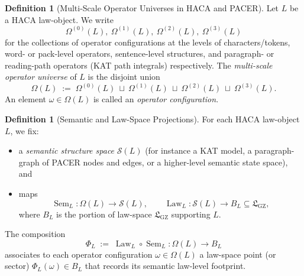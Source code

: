 \documentclass[11pt]{book}
\theoremstyle{plain}
\theoremstyle{definition}
\newtheorem{definition}[theorem]{Definition}
\theoremstyle{remark}
\newcommand{\GZLS}{\ensuremath{\mathfrak{L}_{\mathrm{GZ}}}}       \newcommand{\GZLT}{\ensuremath{M_{!w}}}                           \newcommand{\GZLOC}{\ensuremath{A_M}}                             \newcommand{\GZLC}{\ensuremath{\omega_{\mathrm{law}}}}            \newcommand{\GZLCurv}{\ensuremath{\mathcal{F}_{\mathrm{law}}}}
\begin{document}
\begin{definition}[Multi-Scale Operator Universes in HACA and PACER]
\label{def:haca-operator-universe}
Let $L$ be a HACA law-object. We write
\[
  \Omega^{(0)}(L),\ \Omega^{(1)}(L),\ \Omega^{(2)}(L),\ \Omega^{(3)}(L)
\]
for the collections of operator configurations at the levels of
characters/tokens, word- or pack-level operators, sentence-level
structures, and paragraph- or reading-path operators (KAT path integrals)
respectively. The \emph{multi-scale operator universe} of $L$ is the
disjoint union
\[
  \Omega(L)
  \;:=\;
  \Omega^{(0)}(L)\ \sqcup\ \Omega^{(1)}(L)\ \sqcup\ \Omega^{(2)}(L)\ \sqcup\ \Omega^{(3)}(L).
\]
An element $\omega\in\Omega(L)$ is called an \emph{operator configuration}.



\end{definition}

\begin{definition}[Semantic and Law-Space Projections]
\label{def:haca-sem-law-projections}
For each HACA law-object $L$, we fix:
\begin{itemize}
  \item a \emph{semantic structure space} $\mathcal{S}(L)$ (for instance a
        KAT model, a paragraph-graph of PACER nodes and edges, or a
        higher-level semantic state space), and
  \item maps
        \[
          \operatorname{Sem}_L : \Omega(L) \longrightarrow \mathcal{S}(L),
          \qquad
          \operatorname{Law}_L : \mathcal{S}(L) \longrightarrow B_L
          \subseteq \GZLS,
        \]
        where $B_L$ is the portion of law-space $\GZLS$ supporting $L$.
\end{itemize}
The composition
\[
  \Phi_L
  \;:=\;
  \operatorname{Law}_L \circ \operatorname{Sem}_L
  : \Omega(L) \longrightarrow B_L
\]
associates to each operator configuration $\omega\in\Omega(L)$ a
law-space point (or sector) $\Phi_L(\omega)\in B_L$ that records its
semantic law-level footprint.



\end{definition}
\end{document}
